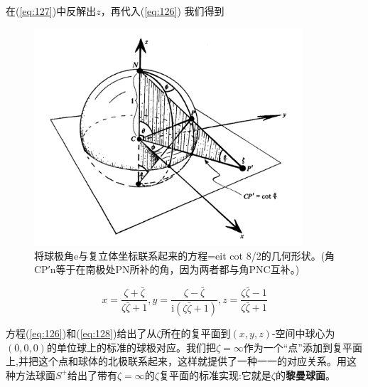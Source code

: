 \documentclass[utf8]{ctexbook}
\numberwithin{equation}{section}
\begin{document}
在(\ref{eq:127})中反解出$z$，再代入(\ref{eq:126}) 我们得到
\begin{figure}
    \centering
    \includegraphics[width=10cm]{fig1-4.png}
    \caption{将球极角e与复立体坐标联系起来的方程=eit cot 8/2的几何形状。(角CP′n等于在南极处PN所补的角，因为两者都与角PNC互补。)}\label{fig:1-4}
\end{figure}
\begin{equation}
    x=\frac{\zeta+\bar{\zeta}}{\zeta\bar{\zeta}+1},y=\frac{\zeta-\bar{\zeta}}{\mathrm{i}(\zeta\bar{\zeta}+1)},z=\frac{\zeta\bar{\zeta}-1}{\zeta\bar{\zeta}+1}\label{eq:128}
\end{equation}

方程(\ref{eq:126})和(\ref{eq:128})给出了从$\zeta$所在的复平面到$(x, y, z)$-空间中球心为$(0,0,0)$的单位球上的标准的球极对应。我们把$\zeta=\infty$作为一个“点”添加到复平面上,并把这个点和球体的北极联系起来，这样就提供了一种一一的对应关系。用这种方法球面$S^+$给出了带有$\zeta=\infty$的$\zeta$复平面的标准实现:它就是$\zeta$的\textbf{黎曼球面}。
\end{document}

